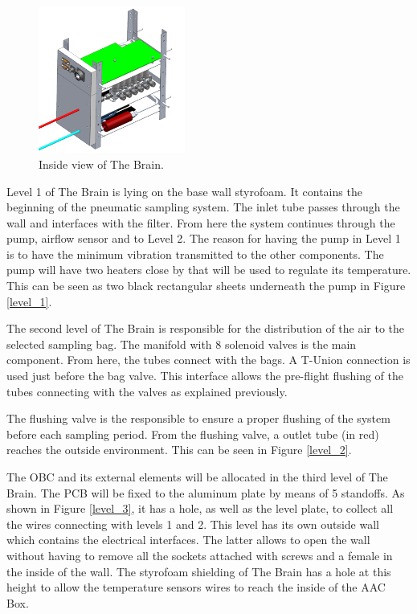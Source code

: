 \begin{figure}[H]
    \centering
    \includegraphics[width=0.43\textwidth]{4-experiment-design/img/Mechanical/The_Brain_Isometric.png}
    \caption{Inside view of The Brain.}
    \label{brain_isometric_open}
\end{figure}
Level 1 of The Brain is lying on the base wall styrofoam. It contains the beginning of the pneumatic sampling system. The inlet tube passes through the wall and interfaces with the filter. From here the system continues through the pump, airflow sensor and to Level 2. The reason for having the pump in Level 1 is to have the minimum vibration transmitted to the other components. The pump will have two heaters close by that will be used to regulate its temperature. This can be seen as two black rectangular sheets underneath the pump in Figure \ref{level_1}.

The second level of The Brain is responsible for the distribution of the air to the selected sampling bag. The manifold with 8 solenoid valves is the main component. From here, the tubes connect with the bags. A T-Union connection is used just before the bag valve. This interface allows the pre-flight flushing of the tubes connecting with the valves as explained previously. 

\smallskip
The flushing valve is the responsible to ensure a proper flushing of the system before each sampling period. From the flushing valve, a outlet tube (in red) reaches the outside environment. This can be seen in Figure \ref{level_2}.

The OBC and its external elements will be allocated in the third level of The Brain. The PCB will be fixed to the aluminum plate by means of 5 standoffs. As shown in Figure \ref{level_3}, it has a hole, as well as the level plate, to collect all the wires connecting with levels 1 and 2. This level has its own outside wall which contains the electrical interfaces. The latter allows to open the wall without having to remove all the sockets attached with screws and a female in the inside of the wall. The styrofoam shielding of The Brain has a hole at this height to allow the temperature sensors wires to reach the inside of the AAC Box. 

